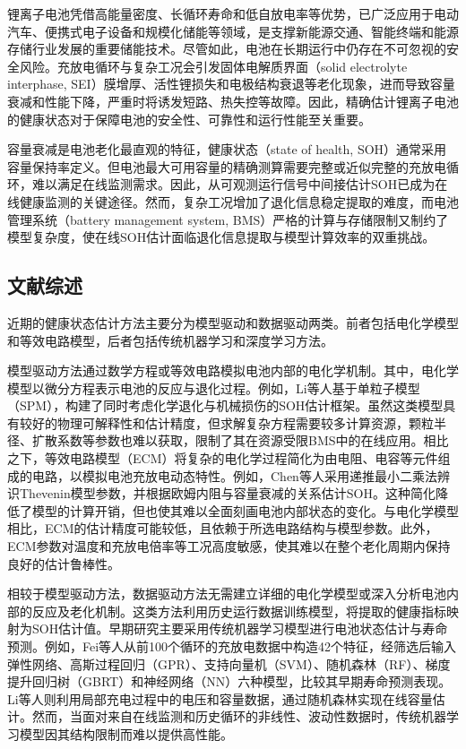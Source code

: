 锂离子电池凭借高能量密度、长循环寿命和低自放电率等优势，已广泛应用于电动汽车、便携式电子设备和规模化储能等领域\cite{ref1,ref2,ref3,ref4}，是支撑新能源交通、智能终端和能源存储行业发展的重要储能技术。尽管如此，电池在长期运行中仍存在不可忽视的安全风险。充放电循环与复杂工况会引发固体电解质界面（solid electrolyte interphase, SEI）膜增厚、活性锂损失和电极结构衰退等老化现象\cite{ref5,ref6}，进而导致容量衰减和性能下降，严重时将诱发短路、热失控等故障\cite{ref7,ref8}。因此，精确估计锂离子电池的健康状态对于保障电池的安全性、可靠性和运行性能至关重要。

容量衰减是电池老化最直观的特征，健康状态（state of health, SOH）通常采用容量保持率定义\cite{ref13,ref14}。但电池最大可用容量的精确测算需要完整或近似完整的充放电循环，难以满足在线监测需求\cite{ref10,ref11}。因此，从可观测运行信号中间接估计SOH已成为在线健康监测的关键途径。然而，复杂工况增加了退化信息稳定提取的难度，而电池管理系统（battery management system, BMS）严格的计算与存储限制又制约了模型复杂度，使在线SOH估计面临退化信息提取与模型计算效率的双重挑战\cite{ref31}。

\subsection{文献综述}

近期的健康状态估计方法主要分为模型驱动和数据驱动两类\cite{ref10,ref11,ref12}。前者包括电化学模型和等效电路模型，后者包括传统机器学习和深度学习方法。

模型驱动方法通过数学方程或等效电路模拟电池内部的电化学机制\cite{ref19}。其中，电化学模型以微分方程表示电池的反应与退化过程。例如，Li等人\cite{ref21}基于单粒子模型（SPM），构建了同时考虑化学退化与机械损伤的SOH估计框架。虽然这类模型具有较好的物理可解释性和估计精度，但求解复杂方程需要较多计算资源，颗粒半径、扩散系数等参数也难以获取，限制了其在资源受限BMS中的在线应用\cite{ref20,ref22,ref23}。相比之下，等效电路模型（ECM）将复杂的电化学过程简化为由电阻、电容等元件组成的电路，以模拟电池充放电动态特性\cite{ref19}。例如，Chen等人\cite{ref24}采用递推最小二乘法辨识Thevenin模型参数，并根据欧姆内阻与容量衰减的关系估计SOH。这种简化降低了模型的计算开销，但也使其难以全面刻画电池内部状态的变化。与电化学模型相比，ECM的估计精度可能较低，且依赖于所选电路结构与模型参数。此外，ECM参数对温度和充放电倍率等工况高度敏感，使其难以在整个老化周期内保持良好的估计鲁棒性\cite{ref19}。

相较于模型驱动方法，数据驱动方法无需建立详细的电化学模型或深入分析电池内部的反应及老化机制\cite{ref11,ref14}。这类方法利用历史运行数据训练模型，将提取的健康指标映射为SOH估计值。早期研究主要采用传统机器学习模型进行电池状态估计与寿命预测\cite{ref25}。例如，Fei等人\cite{ref26}从前100个循环的充放电数据中构造42个特征，经筛选后输入弹性网络、高斯过程回归（GPR）、支持向量机（SVM）、随机森林（RF）、梯度提升回归树（GBRT）和神经网络（NN）六种模型，比较其早期寿命预测表现。Li等人\cite{ref27}则利用局部充电过程中的电压和容量数据，通过随机森林实现在线容量估计。然而，当面对来自在线监测和历史循环的非线性、波动性数据时，传统机器学习模型因其结构限制而难以提供高性能。


